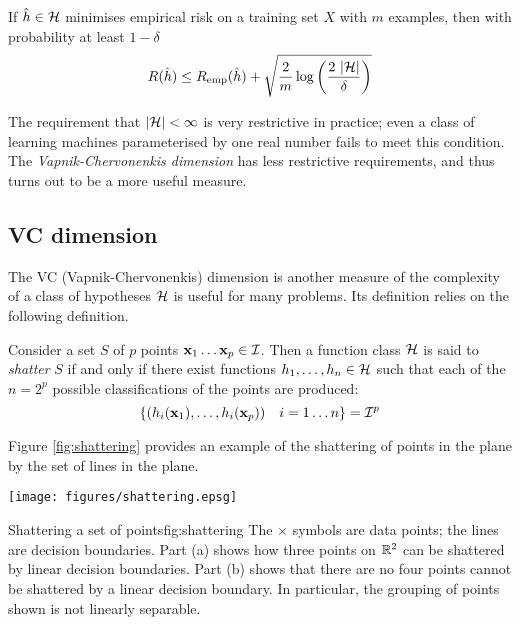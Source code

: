 \begin{theorem}
If $\hat{h} \in \mathcal{H}$ minimises empirical risk on a training set $X$
with $m$ examples, then with probability at least $1 - \delta$
%
\begin{equation}
R(\hat{h}) \leq R_{\mathrm{emp}}(\hat{h}) + \sqrt{\frac{2}{m}
\log \left( \frac{2\  |\mathcal{H}|}{\delta} \right)}
\end{equation}
\end{theorem}

The requirement that $|\mathcal{H}| < \infty$ is very restrictive in
practice; even a class of learning machines parameterised by one real
number fails to meet this condition.  The \emph{Vapnik-Chervonenkis
dimension} has less restrictive requirements, and thus turns out to be
a more useful measure.


\subsection{VC dimension}
\label{acr:vcdim}
\label{sec:vcdim}

The VC (Vapnik-Chervonenkis) dimension is another measure of the complexity
of a class of hypotheses $\mathcal{H}$ is useful for many problems.  Its
definition relies on the following definition.

\begin{definition}[Shattering]
Consider a set $S$ of $p$ points $\mathbf{x}_1 \ldots \mathbf{x}_p \in \mathcal{I}$.  Then a
function class $\mathcal{H}$ is said to \emph{shatter} $S$ if and only if
there exist functions $h_1, \ldots, h_n \in \mathcal{H}$ such that each of
the $n = 2^p$ possible classifications of the points are produced:
%
\begin{equation}
\left\{ (h_i(\mathbf{x}_1), \ldots, h_i(\mathbf{x}_p)) \quad i=1 \ldots n \right\}
= \mathcal{I}^p
\end{equation}
%
\end{definition}

Figure \ref{fig:shattering} provides an example of the shattering of
points in the plane by the set of lines in the plane.

\begin{linefigure}
\begin{center}
\texttt{[image: figures/shattering.epsg]}
\end{center}
\begin{capt}{Shattering a set of points}{fig:shattering}
The $\times$ symbols are data points; the lines are decision boundaries.
Part (a) shows how three points on $\mathbb{R}^2$ can be shattered by linear
decision boundaries.  Part (b) shows that there are no four points
cannot be shattered by a linear decision boundary.  In particular, the
grouping of points shown is not linearly separable.
\end{capt}
\end{linefigure}

